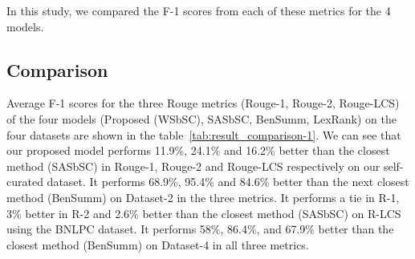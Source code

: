 In this study, we compared the F-1 scores from each of these metrics for the 4 models.

\subsection{Comparison}\label{subsec:comparison}
Average F-1 scores for the three Rouge metrics (Rouge-1, Rouge-2, Rouge-LCS) of the four models (Proposed (WSbSC),
SASbSC, BenSumm, LexRank) on the four datasets are shown in the table~\ref{tab:result_comparison-1}.
We can see that our proposed model performs 11.9\%, 24.1\% and 16.2\% better
than the closest method (SASbSC) in Rouge-1, Rouge-2 and Rouge-LCS respectively
on our self-curated dataset.
It performs 68.9\%, 95.4\% and 84.6\% better than the next closest method (BenSumm) on
Dataset-2 in the three metrics.
It performs a tie in R-1, 3\% better in R-2 and 2.6\% better than
the closest method (SASbSC) on R-LCS using the BNLPC dataset.
It performs 58\%, 86.4\%, and 67.9\% better than the closest
method (BenSumm) on Dataset-4 in all three metrics.\\

